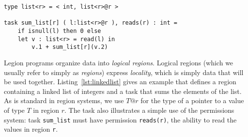 \begin{lstlisting}[float={t},label={lst:linkedlist},caption={Linked List Example}]
type list<r> = < int, list<r>@r >

task sum_list[r] ( l:list<r>@r ), reads(r) : int =
    if isnull(l) then 0 else
    let v : list<r> = read(l) in
        v.1 + sum_list[r](v.2)
\end{lstlisting}

Legion programs organize data into {\em logical regions}.  Logical
regions (which we usually refer to simply as {\em regions}) express
{\em locality}, which is simply data that will be used together.
Listing~\ref{lst:linkedlist} gives an example that defines a region
containing a linked list of integers and a task that sums the elements
of the list.  As is standard in region systems, we use $T @ r$ for the
type of a pointer to a value of type $T$ in region $r$.  The task also
illustrates a simple use of the permissions system:
task {\tt sum\_list} must have permission {\tt reads(r)}, the ability
to read the values in region {\tt r}.


